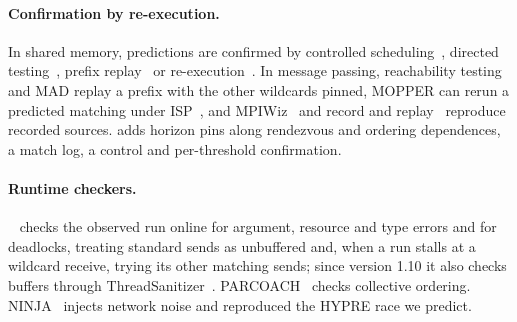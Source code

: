 \paragraph{Confirmation by re-execution.} In shared memory, predictions are confirmed by
controlled scheduling~\citep{bensalem06confirmation,joshi09deadlockfuzzer}, directed
testing~\citep{sen08racefuzzer}, prefix replay~\citep{sorrentino10penelope}
or re-execution~\citep{farzan12exceptionull,huang15mcr}. In message passing, reachability
testing and MAD replay a prefix with the other wildcards pinned, MOPPER can rerun a predicted
matching
under ISP~\citep{forejt17mopper}, and MPIWiz~\citep{xue09mpiwiz} and record and
replay~\citep{netzer92replay,sato15rempi} reproduce recorded sources. \tool adds horizon pins
along rendezvous and ordering dependences, a match log, a control and per-threshold
confirmation.

\paragraph{Runtime checkers.} \MUST~\citep{hilbrich12must} checks the observed run online for
argument, resource and type errors and for deadlocks, treating standard sends as unbuffered and,
when a run stalls at a wildcard receive, trying its other matching sends; since version 1.10 it
also checks buffers through ThreadSanitizer~\citep{jenke23tsanfibers}. PARCOACH~\citep{saillard14parcoach}
checks collective ordering. NINJA~\citep{sato17ninja} injects network noise and
reproduced the HYPRE race we predict.
